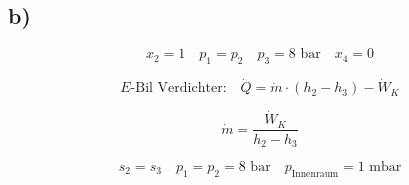 

\subsection*{b)}

\[
x_2 = 1 \quad p_1 = p_2 \quad p_3 = 8 \text{ bar} \quad x_4 = 0
\]

\[
E\text{-Bil Verdichter:} \quad \dot{Q} = \dot{m} \cdot (h_2 - h_3) - \dot{W}_K
\]

\[
\dot{m} = \frac{\dot{W}_K}{h_2 - h_3}
\]

\[
s_2 = s_3 \quad p_1 = p_2 = 8 \text{ bar} \quad p_{\text{Innenraum}} = 1 \text{ mbar}
\]